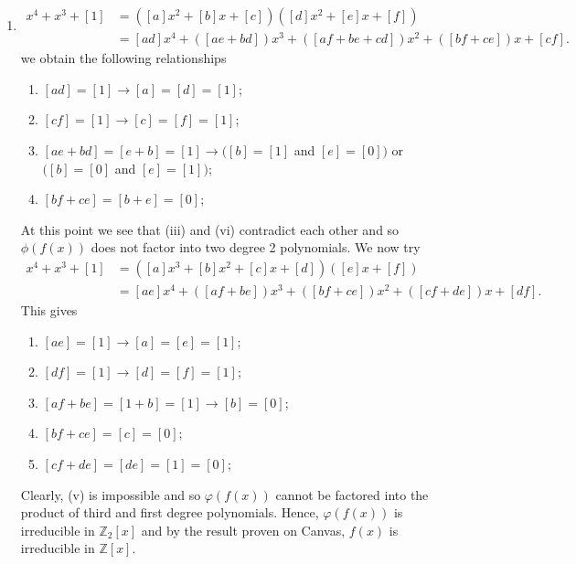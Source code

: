 \documentclass[12pt]{article}
\makeatletter
\theoremstyle{definition}
\theoremstyle{remark}
\newenvironment{solution}[1][\bf{\textit{Solution}}]{\par
  
  \normalfont \topsep6\p@\@plus6\p@\relax
  \list{}{\leftmargin=0mm
          \rightmargin=4mm
          \settowidth{\itemindent}{\itshape#1}%
          \labelwidth=\itemindent
          \parsep=0pt \listparindent=\parindent 
  }
  \item[\hskip\labelsep
        \itshape
    #1\@addpunct{.}]\ignorespaces
}{%
  \popQED\endlist\@endpefalse
}
\makeatother
\begin{document}
\begin{enumerate}[leftmargin=*]
\begin{solution}
                    \begin{equation*}
                        \begin{split}
                            x^4+x^3+[1]&=([a]x^2+[b]x+[c])([d]x^2+[e]x+[f]) \\
                            &= [ad]x^4+([ae+bd])x^3+([af+be+cd])x^2+([bf+ce])x+[cf].
                        \end{split}
                    \end{equation*}
                we obtain the following relationships
                    \begin{enumerate}[label=(\roman*)]
                        \item $[ad]=[1]\rightarrow[a]=[d]=[1]$;
                        \item $[cf]=[1]\rightarrow[c]=[f]=[1]$;
                        \item $[ae+bd]=[e+b]=[1]\rightarrow([b]=[1]$ and $[e]=[0])$ or $([b]=[0]$ and $[e]=[1])$;
                        \item $[bf+ce]=[b+e]=[0]$;
                    \end{enumerate}
                At this point we see that (iii) and (vi) contradict each other and so $\phi(f(x))$ does not factor into two degree 2 polynomials. We now try
                    \begin{equation*}
                        \begin{split}
                            x^4+x^3+[1]&=([a]x^3+[b]x^2+[c]x+[d])([e]x+[f]) \\
                            &=[ae]x^4+([af+be])x^3+([bf+ce])x^2+([cf+de])x+[df].
                        \end{split}
                    \end{equation*}
                This gives
                    \begin{enumerate}[label=(\roman*)]
                        \item $[ae]=[1]\rightarrow[a]=[e]=[1]$;
                        \item $[df]=[1]\rightarrow[d]=[f]=[1]$;
                        \item $[af+be]=[1+b]=[1]\rightarrow[b]=[0]$;
                        \item $[bf+ce]=[c]=[0]$;
                        \item $[cf+de]=[de]=[1]=[0]$;
                    \end{enumerate}
                Clearly, (v) is impossible and so $\varphi(f(x))$ cannot be factored into the product of  third and first degree polynomials. Hence, $\varphi(f(x))$ is irreducible in $\mathbb{Z}_2[x]$ and by the result proven on Canvas, $f(x)$ is irreducible in $\mathbb{Z}[x]$.
            \end{solution}
    \end{enumerate}
\end{document}
